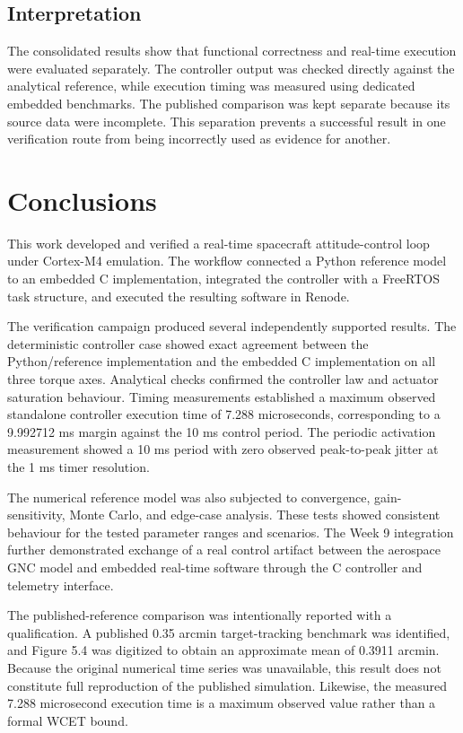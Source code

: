 \documentclass[11pt,a4paper]{article}
\begin{document}
\subsection{Interpretation}

The consolidated results show that functional correctness and real-time execution were evaluated separately. The controller output was checked directly against the analytical reference, while execution timing was measured using dedicated embedded benchmarks. The published comparison was kept separate because its source data were incomplete. This separation prevents a successful result in one verification route from being incorrectly used as evidence for another.

\section{Conclusions}

This work developed and verified a real-time spacecraft attitude-control loop under Cortex-M4 emulation. The workflow connected a Python reference model to an embedded C implementation, integrated the controller with a FreeRTOS task structure, and executed the resulting software in Renode.

The verification campaign produced several independently supported results. The deterministic controller case showed exact agreement between the Python/reference implementation and the embedded C implementation on all three torque axes. Analytical checks confirmed the controller law and actuator saturation behaviour. Timing measurements established a maximum observed standalone controller execution time of 7.288 microseconds, corresponding to a 9.992712 ms margin against the 10 ms control period. The periodic activation measurement showed a 10 ms period with zero observed peak-to-peak jitter at the 1 ms timer resolution.

The numerical reference model was also subjected to convergence, gain-sensitivity, Monte Carlo, and edge-case analysis. These tests showed consistent behaviour for the tested parameter ranges and scenarios. The Week 9 integration further demonstrated exchange of a real control artifact between the aerospace GNC model and embedded real-time software through the C controller and telemetry interface.

The published-reference comparison was intentionally reported with a qualification. A published 0.35 arcmin target-tracking benchmark was identified, and Figure 5.4 was digitized to obtain an approximate mean of 0.3911 arcmin. Because the original numerical time series was unavailable, this result does not constitute full reproduction of the published simulation. Likewise, the measured 7.288 microsecond execution time is a maximum observed value rather than a formal WCET bound.
\end{document}
